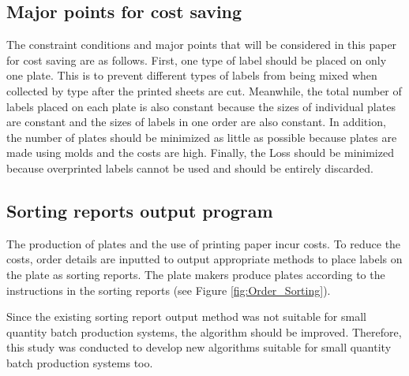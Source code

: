 \documentclass[a4paper]{amsart}
\numberwithin{equation}{section} %
\numberwithin{figure}{section} %
\numberwithin{table}{section}
\theoremstyle{plain}
\theoremstyle{definition}
\theoremstyle{plain}
\theoremstyle{plain}
\theoremstyle{plain}
\theoremstyle{plain}
\theoremstyle{plain}
\begin{document}
\subsection{Major points for cost saving}\label{subsec:CostSave}
The constraint conditions and major points that will be considered in this paper for cost saving are as follows. First, one type of label should be placed on only one plate. This is to prevent different types of labels from being mixed when collected by type after the printed sheets are cut. Meanwhile, the total number of labels placed on each plate is also constant because the sizes of individual plates are constant and the sizes of labels in one order are also constant. In addition, the number of plates should be minimized as little as possible because plates are made using molds and the costs are high. Finally, the Loss should be minimized because overprinted labels cannot be used and should be entirely discarded.

\subsection{Sorting reports output program}\label{subsec:SortProgram}
The production of plates and the use of printing paper incur costs. To reduce the costs, order details are inputted to output appropriate methods to place labels on the plate as sorting reports. The plate makers produce plates according to the instructions in the sorting reports (see Figure \ref{fig:Order_Sorting}).

Since the existing sorting report output method was not suitable for small quantity batch production systems, the algorithm should be improved. Therefore, this study was conducted to develop new algorithms suitable for small quantity batch production systems too.
\end{document}
